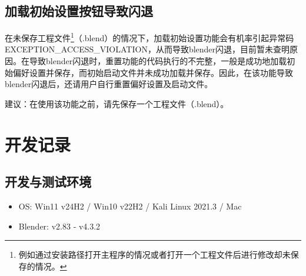 \documentclass{../../public_resources/doc}
\begin{document}
\subsection{加载初始设置按钮导致闪退}
在未保存工程文件\footnote{例如通过安装路径打开主程序的情况或者打开一个工程文件后进行修改却未保存的情况。}（.blend）的情况下，加载初始设置功能会有机率引起异常码EXCEPTION\_ACCESS\_VIOLATION，从而导致blender闪退，目前暂未查明原因。在导致blender闪退时，重置功能的代码执行的不完整，一般是成功地加载初始偏好设置并保存，而初始启动文件并未成功加载并保存。因此，在该功能导致blender闪退后，还请用户自行重置偏好设置及启动文件。

建议：在使用该功能之前，请先保存一个工程文件（.blend）。

\section{开发记录}
\subsection{开发与测试环境}
\begin{itemize}
    \item OS: Win11 v24H2 / Win10 v22H2 / Kali Linux 2021.3 / Mac
    \item Blender: v2.83 ‑ v4.3.2
\end{itemize}
\end{document}
